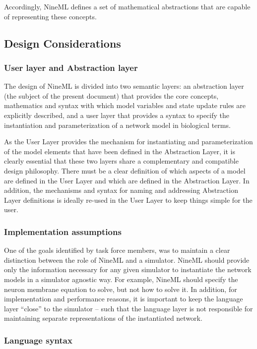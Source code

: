 \documentclass[a4paper]{article}
\begin{document}
Accordingly, NineML defines a set of mathematical abstractions that
are capable of representing these concepts.

\subsection{Design Considerations}


\subsubsection{User layer and Abstraction layer}

The design of NineML is divided into two semantic layers: an abstraction
layer (the subject of the present document) that provides the core
concepts, mathematics and syntax with which model variables and state
update rules are explicitly described, and a user layer that provides a
syntax to specify the instantiation and parameterization of a network
model in biological terms.

As the User Layer provides the mechanism for instantiating and
parameterization of the model elements that have been defined in the
Abstraction Layer, it is clearly essential that these two layers share
a complementary and compatible design philosophy. There must be a
clear definition of which aspects of a model are defined in the User
Layer and which are defined in the Abstraction Layer. In addition, the
mechanisms and syntax for naming and addressing Abstraction Layer definitions
is ideally re-used in the User Layer to keep things simple for the user.
 
\subsubsection{Implementation assumptions}

One of the goals identified by task force members, was to maintain a
clear distinction between the role of NineML and a simulator. NineML
should provide only the information necessary for any given simulator
to instantiate the network models in a simulator agnostic way.  For
example, NineML should specify the neuron membrane equation to solve,
but not how to solve it.  In addition, for implementation and
performance reasons, it is important to keep the language layer
“close” to the simulator – such that the language layer is not
responsible for maintaining separate representations of the
instantiated network.

\subsubsection{Language syntax}
\end{document}
